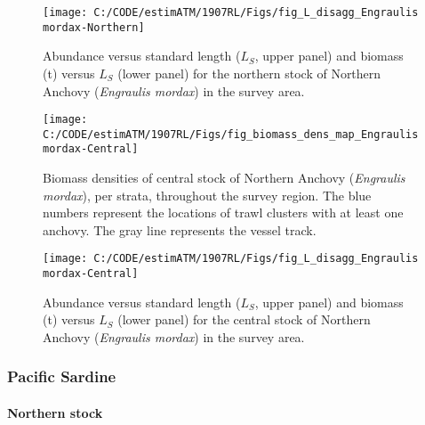 \documentclass[]{article}
\let\oldparagraph\paragraph
\renewcommand{\paragraph}[1]{\oldparagraph{#1}\mbox{}}
\begin{document}
\newpage



\begin{figure}[H]

{\centering \texttt{[image: C:/CODE/estimATM/1907RL/Figs/fig\_L\_disagg\_Engraulis mordax-Northern]} 

}

\caption{Abundance versus standard length (\(L_S\), upper panel) and biomass (t) versus \(L_S\) (lower panel) for the northern stock of Northern Anchovy (\emph{Engraulis mordax}) in the survey area.}\label{fig:l-disagg-anch-n}
\end{figure}

\newpage



\begin{figure}[H]

{\centering \texttt{[image: C:/CODE/estimATM/1907RL/Figs/fig\_biomass\_dens\_map\_Engraulis mordax-Central]} 

}

\caption{Biomass densities of central stock of Northern Anchovy (\emph{Engraulis mordax}), per strata, throughout the survey region. The blue numbers represent the locations of trawl clusters with at least one anchovy. The gray line represents the vessel track.}\label{fig:biom-dens-anch-c}
\end{figure}

\newpage



\begin{figure}[H]

{\centering \texttt{[image: C:/CODE/estimATM/1907RL/Figs/fig\_L\_disagg\_Engraulis mordax-Central]} 

}

\caption{Abundance versus standard length (\(L_S\), upper panel) and biomass (t) versus \(L_S\) (lower panel) for the central stock of Northern Anchovy (\emph{Engraulis mordax}) in the survey area.}\label{fig:l-disagg-anch-c}
\end{figure}

\newpage

\hypertarget{results-sardine}{%
\subsubsection{Pacific Sardine}\label{results-sardine}}

\hypertarget{results-sardine-northern}{%
\paragraph{Northern stock}\label{results-sardine-northern}}
\end{document}
